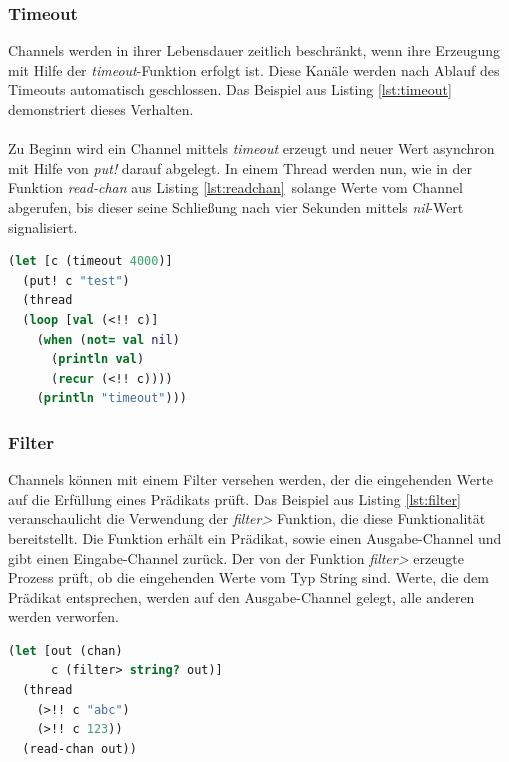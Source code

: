 \documentclass[12pt,a4paper,parskip=half,listof=totoc]{scrreprt}
\begin{document}
\subsubsection{Timeout}
Channels werden in ihrer Lebensdauer zeitlich beschränkt, wenn ihre Erzeugung mit Hilfe der \textit{timeout}-Funktion erfolgt ist. Diese Kanäle werden nach Ablauf des Timeouts automatisch geschlossen. Das Beispiel aus Listing \ref{lst:timeout} demonstriert dieses Verhalten.\\
\\
Zu Beginn wird ein Channel mittels \textit{timeout} erzeugt und neuer Wert asynchron mit Hilfe von \textit{put!} darauf abgelegt. In einem Thread werden nun, wie in der Funktion \textit{read-chan} aus Listing \ref{lst:readchan}\ solange Werte vom Channel abgerufen, bis dieser seine Schließung nach vier Sekunden mittels \textit{nil}-Wert signalisiert.
\begin{lstlisting}[language=Clojure,caption=Timeout,label=lst:timeout]
(let [c (timeout 4000)]
  (put! c "test")
  (thread
  (loop [val (<!! c)]
    (when (not= val nil)
      (println val)
      (recur (<!! c))))
    (println "timeout")))
\end{lstlisting}
\subsubsection{Filter}
Channels können mit einem Filter versehen werden, der die eingehenden Werte auf die Erfüllung eines Prädikats prüft. Das Beispiel aus Listing \ref{lst:filter} veranschaulicht die Verwendung der \textit{filter>} Funktion, die diese Funktionalität bereitstellt. Die Funktion erhält ein Prädikat, sowie einen Ausgabe-Channel und gibt einen Eingabe-Channel zurück. Der von der Funktion \textit{filter>} erzeugte Prozess prüft, ob die eingehenden Werte vom Typ String sind. Werte, die dem Prädikat entsprechen, werden auf den Ausgabe-Channel gelegt, alle anderen werden verworfen.

\begin{lstlisting}[language=Clojure,caption=Filter,label=lst:filter]
(let [out (chan)
      c (filter> string? out)]
  (thread
    (>!! c "abc")
    (>!! c 123))
  (read-chan out))
\end{lstlisting}
\end{document}
